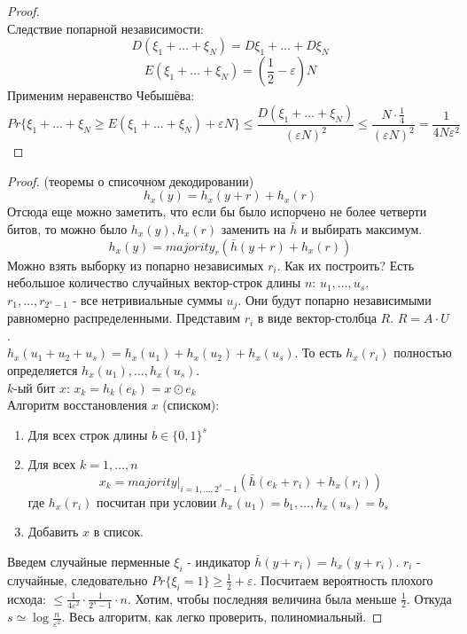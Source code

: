 \documentclass[a4paper]{article}
\theoremstyle{definition}
\theoremstyle{plain}
\begin{document}
\begin{proof}~\\
	Следствие попарной независимости:
	$$
		D(\xi_1 + \ldots + \xi_N) = D\xi_1 + \ldots + D\xi_N	
	$$
	$$
		E(\xi_1 + \ldots + \xi_N) =(\frac{1}{2} - \varepsilon)N	
	$$
	Применим неравенство Чебышёва:
	$$
		Pr\{\xi_1 + \ldots + \xi_N \ge E(\xi_1 + \ldots + \xi_N) + \varepsilon N\} \le \frac{D(\xi_1 + \ldots + \xi_N)}{(\varepsilon N)^2} \le \frac{N \cdot \frac{1}{4}}{(\varepsilon N)^2} =	\frac{1}{4N\varepsilon^2}
	$$
\end{proof}

\begin{proof}(теоремы о списочном декодировании)~\\
	$$
		h_x(y) = h_x(y + r) + h_x(r)	
	$$
	Отсюда еще можно заметить, что если бы было испорчено не более четверти битов, то
	можно было $h_x(y), h_x(r)$ заменить на $\bar{h}$ и выбирать максимум.
	$$
		h_x(y) = majority_r(\bar{h}(y + r) + h_x(r))	
	$$
	Можно взять выборку из попарно независимых $r_i$. Как их построить?
	Есть небольшое количество случайных вектор-строк длины $n$: $u_1, \ldots, u_s$.~\\
	$r_1, \ldots, r_{2^s - 1}$ - все нетривиальные суммы $u_j$. Они будут
	попарно независимыми равномерно распределенными.
	Представим $r_i$ в виде вектор-столбца $R$. $R = A \cdot U$.~\\
	
	\noindent $h_x(u_1 + u_2 + u_s) = h_x(u_1) + h_x(u_2) + h_x(u_s)$.
	То есть $h_x(r_i)$ полностью определяется $h_x(u_1), \ldots, h_x(u_s)$.~\\
	
	\noindent $k$-ый бит $x$: $x_k = h_k(e_k) = x \odot e_k$~\\	
	
	\noindent Алгоритм восстановления $x$ (списком):
	\begin{enumerate}
		\item Для всех строк длины $b \in \{0, 1\}^s$
		\item Для всех $k = 1, \ldots, n$~\\
			$$
				x_k = majority\vert_{i = 1, \ldots, 2^s - 1}(\bar{h}(e_k + r_i) + h_x(r_i))		
			$$
			где $h_x(r_i)$ посчитан при условии $h_x(u_1) = b_1, \ldots, h_x(u_s) = b_s$
		\item Добавить $x$ в список.
	\end{enumerate}
	
	\noindent Введем случайные перменные $\xi_i$ - индикатор $\bar{h}(y + r_i) = h_x(y + r_i)$.
	$r_i$ - случайные, следовательно $Pr\{\xi_i = 1\} \ge \frac{1}{2} + \varepsilon$.
	Посчитаем вероятность плохого исхода: $\le \frac{1}{4\varepsilon^2}\cdot\frac{1}{2^s - 1}\cdot n$.
	Хотим, чтобы последняя величина была меньше $\frac{1}{2}$. Откуда $s \simeq \log \frac{n}{\varepsilon^2}$. Весь алгоритм, как легко проверить, полиномиальный.
\end{proof}
\end{document}
